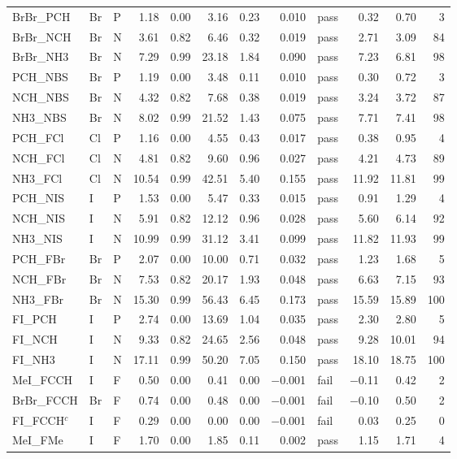 {\begin{longtable}{lllrrrrrlrrr}
BrBr\_PCH & Br & P & 1.18 & 0.00 & 3.16 & 0.23 & 0.010 & pass & 0.32 & 0.70 & 3\\
BrBr\_NCH & Br & N & 3.61 & 0.82 & 6.46 & 0.32 & 0.019 & pass & 2.71 & 3.09 & 84\\
BrBr\_NH3 & Br & N & 7.29 & 0.99 & 23.18 & 1.84 & 0.090 & pass & 7.23 & 6.81 & 98\\
PCH\_NBS & Br & P & 1.19 & 0.00 & 3.48 & 0.11 & 0.010 & pass & 0.30 & 0.72 & 3\\
NCH\_NBS & Br & N & 4.32 & 0.82 & 7.68 & 0.38 & 0.019 & pass & 3.24 & 3.72 & 87\\
NH3\_NBS & Br & N & 8.02 & 0.99 & 21.52 & 1.43 & 0.075 & pass & 7.71 & 7.41 & 98\\
PCH\_FCl & Cl & P & 1.16 & 0.00 & 4.55 & 0.43 & 0.017 & pass & 0.38 & 0.95 & 4\\
NCH\_FCl & Cl & N & 4.81 & 0.82 & 9.60 & 0.96 & 0.027 & pass & 4.21 & 4.73 & 89\\
NH3\_FCl & Cl & N & 10.54 & 0.99 & 42.51 & 5.40 & 0.155 & pass & 11.92 & 11.81 & 99\\
PCH\_NIS & I & P & 1.53 & 0.00 & 5.47 & 0.33 & 0.015 & pass & 0.91 & 1.29 & 4\\
NCH\_NIS & I & N & 5.91 & 0.82 & 12.12 & 0.96 & 0.028 & pass & 5.60 & 6.14 & 92\\
NH3\_NIS & I & N & 10.99 & 0.99 & 31.12 & 3.41 & 0.099 & pass & 11.82 & 11.93 & 99\\
PCH\_FBr & Br & P & 2.07 & 0.00 & 10.00 & 0.71 & 0.032 & pass & 1.23 & 1.68 & 5\\
NCH\_FBr & Br & N & 7.53 & 0.82 & 20.17 & 1.93 & 0.048 & pass & 6.63 & 7.15 & 93\\
NH3\_FBr & Br & N & 15.30 & 0.99 & 56.43 & 6.45 & 0.173 & pass & 15.59 & 15.89 & 100\\
FI\_PCH & I & P & 2.74 & 0.00 & 13.69 & 1.04 & 0.035 & pass & 2.30 & 2.80 & 5\\
FI\_NCH & I & N & 9.33 & 0.82 & 24.65 & 2.56 & 0.048 & pass & 9.28 & 10.01 & 94\\
FI\_NH3 & I & N & 17.11 & 0.99 & 50.20 & 7.05 & 0.150 & pass & 18.10 & 18.75 & 100\\
MeI\_FCCH & I & F & 0.50 & 0.00 & 0.41 & 0.00 & $-$0.001 & fail & $-$0.11 & 0.42 & 2\\
BrBr\_FCCH & Br & F & 0.74 & 0.00 & 0.48 & 0.00 & $-$0.001 & fail & $-$0.10 & 0.50 & 2\\
FI\_FCCH$^c$ & I & F & 0.29 & 0.00 & 0.00 & 0.00 & $-$0.001 & fail & 0.03 & 0.25 & 0\\
MeI\_FMe & I & F & 1.70 & 0.00 & 1.85 & 0.11 & 0.002 & pass & 1.15 & 1.71 & 4\\

\end{longtable}}
